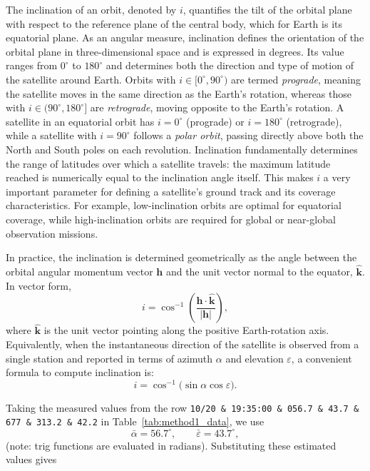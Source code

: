 \documentclass{article}
\begin{document}
The inclination of an orbit, denoted by $i$, quantifies the tilt of the orbital plane with respect to the reference plane of the central body, which for Earth is its equatorial plane. As an angular measure, inclination defines the orientation of the orbital plane in three-dimensional space and is expressed in degrees. Its value ranges from $0^{\circ}$ to $180^{\circ}$ and determines both the direction and type of motion of the satellite around Earth. Orbits with $i \in [0^{\circ}, 90^{\circ})$ are termed \emph{prograde}, meaning the satellite moves in the same direction as the Earth's rotation, whereas those with $i \in (90^{\circ}, 180^{\circ}]$ are \emph{retrograde}, moving opposite to the Earth's rotation. A satellite in an equatorial orbit has $i = 0^{\circ}$ (prograde) or $i = 180^{\circ}$ (retrograde), while a satellite with $i = 90^{\circ}$ follows a \emph{polar orbit}, passing directly above both the North and South poles on each revolution.  Inclination fundamentally determines the range of latitudes over which a satellite travels: the maximum latitude reached is numerically equal to the inclination angle itself. This makes $i$ a very important parameter for defining a satellite’s ground track and its coverage characteristics. For example, low-inclination orbits are optimal for equatorial coverage, while high-inclination orbits are required for global or near-global observation missions.  

In practice, the inclination is determined geometrically as the angle between the orbital angular momentum vector $\mathbf{h}$ and the unit vector normal to the equator, $\hat{\mathbf{k}}$. In vector form,
\begin{equation}
    \label{eq:inclination}
    i = \cos^{-1}\!\left(\frac{\mathbf{h}\cdot\hat{\mathbf{k}}}{|\mathbf{h}|}\right),
\end{equation}
where $\hat{\mathbf{k}}$ is the unit vector pointing along the positive Earth-rotation axis. Equivalently, when the instantaneous direction of the satellite is observed from a single station and reported in terms of azimuth $\alpha$ and elevation $\varepsilon$, a convenient formula to compute inclination is:
\[
i = \cos^{-1}\!\big(\sin\alpha\cos\varepsilon\big).
\]

Taking the measured values from the row
\texttt{10/20 \& 19:35:00 \& 056.7 \& 43.7 \& 677 \& 313.2 \& 42.2} in Table~\ref{tab:method1_data}, we use
\[
\bar{\alpha} = 56.7^\circ,\qquad \bar{\varepsilon} = 43.7^\circ,
\]
(note: trig functions are evaluated in radians). Substituting these estimated values gives
\end{document}

